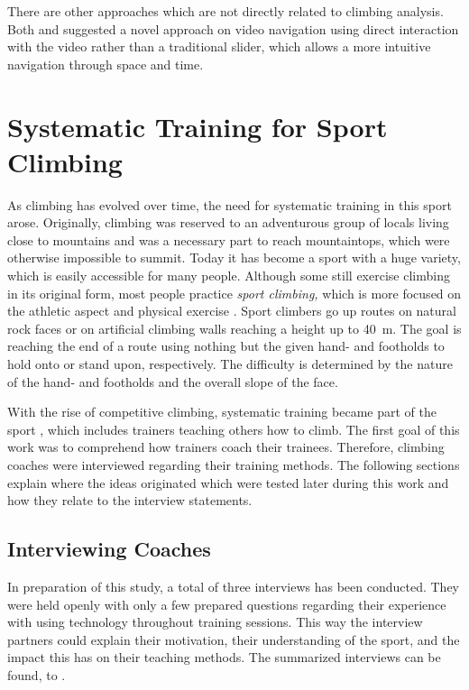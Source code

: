 There are other approaches which are not directly related to climbing analysis. Both \textcite{Goldman:2008:VOA:1449715.1449719} and \textcite{Dragicevic:2008:VBD:1357054.1357096} suggested a novel approach on video navigation using direct interaction with the video rather than a traditional slider, which allows a more intuitive navigation through space and time.

\section{Systematic Training for Sport Climbing}

As climbing has evolved over time, the need for systematic training in this sport arose. Originally, climbing was reserved to an adventurous group of locals living close to mountains and was a necessary part to reach mountaintops, which were otherwise impossible to summit. Today it has become a sport with a huge variety, which is easily accessible for many people. Although some still exercise climbing in its original form, most people practice \textit{sport climbing,} which is more focused on the athletic aspect and physical exercise \autocite{Kosmalla:2016:CIP:2858036.2858562}. Sport climbers go up routes on natural rock faces or on artificial climbing walls reaching a height up to \SI{40}{\m}. The goal is reaching the end of a route using nothing but the given hand- and footholds to hold onto or stand upon, respectively. The difficulty is determined by the nature of the hand- and footholds and the overall slope of the face.

With the rise of competitive climbing, systematic training became part of the sport \autocite{billat1995energy, horst2016training}, which includes trainers teaching others how to climb. The first goal of this work was to comprehend how trainers coach their trainees. Therefore, climbing coaches were interviewed regarding their training methods. The following sections explain where the ideas originated which were tested later during this work and how they relate to the interview statements.

\subsection{Interviewing Coaches}

In preparation of this study, a total of three interviews has been conducted. They were held openly with only a few prepared questions regarding their experience with using technology throughout training sessions. This way the interview partners could explain their motivation, their understanding of the sport, and the impact this has on their teaching methods. The summarized interviews can be found, \cf {} to .

